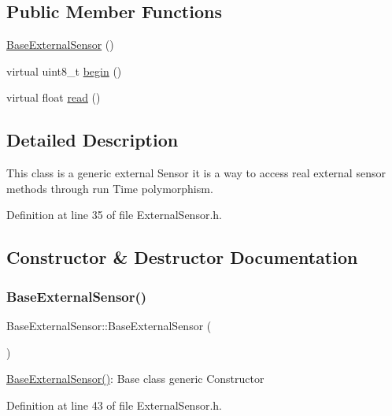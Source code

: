 \subsection*{Public Member Functions}
\begin{DoxyCompactItemize}
\item 
\hyperlink{classBaseExternalSensor_a978d96a6563b646efb358c2790a9fc6f}{Base\+External\+Sensor} ()
\item 
virtual uint8\+\_\+t \hyperlink{classBaseExternalSensor_a87d132803d4f4fdd4e66332809f0c9a0}{begin} ()
\item 
virtual float \hyperlink{classBaseExternalSensor_a1564f16deacf57b51b9948ac29db4291}{read} ()
\end{DoxyCompactItemize}


\subsection{Detailed Description}
This class is a generic external Sensor it is a way to access real external sensor methods through run Time polymorphism. 

Definition at line 35 of file External\+Sensor.\+h.



\subsection{Constructor \& Destructor Documentation}
\mbox{\label{classBaseExternalSensor_a978d96a6563b646efb358c2790a9fc6f}} 
\subsubsection{\texorpdfstring{Base\+External\+Sensor()}{BaseExternalSensor()}}
{\footnotesize\ttfamily Base\+External\+Sensor\+::\+Base\+External\+Sensor (\begin{DoxyParamCaption}{ }\end{DoxyParamCaption})\hspace{0.3cm}{\ttfamily [inline]}}

\hyperlink{classBaseExternalSensor_a978d96a6563b646efb358c2790a9fc6f}{Base\+External\+Sensor()}\+: Base class generic Constructor 

Definition at line 43 of file External\+Sensor.\+h.


